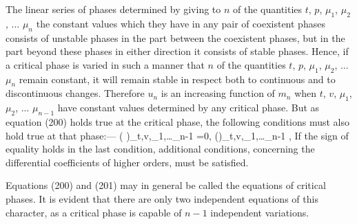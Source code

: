 \documentclass[12pt]{article}
\begin{document}
The linear series of phases determined by giving to $n$ of the quantities $t$, $p$, $\mu_1$, $\mu_2$, ... $\mu_n$ the constant values which they have in any pair of coexistent phases consists of unstable phases in the part between the coexistent phases, but in the part beyond these phases in either direction it consists of stable phases. Hence, if a critical phase is varied in such a manner that $n$ of the quantities $t$, $p$, $\mu_1$, $\mu_2$, ... $\mu_n$ remain constant, it will remain stable in respect both to continuous and to discontinuous changes. Therefore $u_n$ is an increasing function of $m_n$ when $t$, $v$, $\mu_1$, $\mu_2$, ... $\mu_{n-1}$ have constant values determined by any critical phase. But as equation (200) holds true at the critical phase, the following conditions must also hold true at that phase:---
\eqs \left( \right)_{t,v,\mu_1,\dots \mu_{n-1}} =0,   
\label{201}\eqe
\eqs \left(\right)_{t,v,\mu_1,\dots \mu_{n-1}} , 
\label{202}\eqe
If the sign of equality holds in the last condition, additional conditions, concerning the differential coefficients of higher orders, must be satisfied. 


Equations (200) and (201) may in general be called the equations of critical phases. It is evident that there are only two independent equations of this character, as a critical phase is capable of $n - 1$ independent variations.
\end{document}
